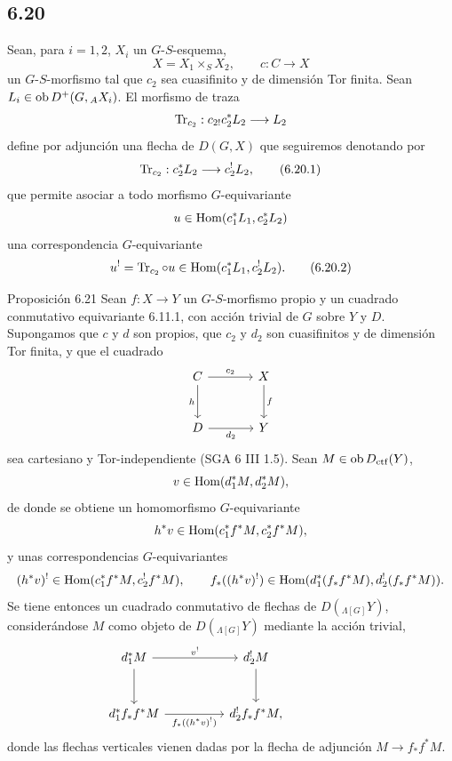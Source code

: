 \subsection*{6.20}
Sean, para $i=1,2$, $X_i$ un $G$-$S$-esquema,
\[
X=X_1\times_SX_2,\qquad c:C\to X
\]
un $G$-$S$-morfismo tal que $c_2$ sea cuasifinito y de dimensión Tor finita. Sean $L_i\in\operatorname{ob} D^+(G,{}_AX_i)$. El morfismo de traza
\[
\operatorname{Tr}_{c_2}:c_{2!}c_2^*L_2\longrightarrow L_2
\]
define por adjunción una flecha de $D(G,X)$ que seguiremos denotando por
\begin{equation}
\operatorname{Tr}_{c_2}:c_2^*L_2\longrightarrow c_2^!L_2,
\tag{6.20.1}
\end{equation}
que permite asociar a todo morfismo $G$-equivariante
\[
u\in\operatorname{Hom}(c_1^*L_1,c_2^*L_2)
\]
una correspondencia $G$-equivariante
\begin{equation}
u^! = \operatorname{Tr}_{c_2}\circ u\in\operatorname{Hom}(c_1^*L_1,c_2^!L_2).
\tag{6.20.2}
\end{equation}

\begin{statement}{Proposición 6.21}
Sean $f:X\to Y$ un $G$-$S$-morfismo propio y un cuadrado conmutativo equivariante 6.11.1, con acción trivial de $G$ sobre $Y$ y $D$. Supongamos que $c$ y $d$ son propios, que $c_2$ y $d_2$ son cuasifinitos y de dimensión Tor finita, y que el cuadrado
\[
\begin{tikzcd}[column sep=large,row sep=large]
C \arrow[r,"c_2"] \arrow[d,"h"'] & X \arrow[d,"f"]\\
D \arrow[r,"d_2"'] & Y
\end{tikzcd}
\]
sea cartesiano y Tor-independiente (SGA 6 III 1.5). Sean $M\in\operatorname{ob} D_{\mathrm{ctf}}(Y)$,
\[
v\in\operatorname{Hom}(d_1^*M,d_2^*M),
\]
de donde se obtiene un homomorfismo $G$-equivariante
\[
h^*v\in\operatorname{Hom}(c_1^*f^*M,c_2^*f^*M),
\]
y unas correspondencias $G$-equivariantes
\[
(h^*v)^!\in\operatorname{Hom}(c_1^*f^*M,c_2^!f^*M),
\qquad
f_*((h^*v)^!)\in\operatorname{Hom}(d_1^*(f_*f^*M),d_2^!(f_*f^*M)).
\]
Se tiene entonces un cuadrado conmutativo de flechas de $D({}_{\Lambda[G]}Y)$, considerándose $M$ como objeto de $D({}_{\Lambda[G]}Y)$ mediante la acción trivial,
\[
\begin{tikzcd}[column sep=huge,row sep=large]
d_1^*M \arrow[r,"v^!"] \arrow[d] & d_2^!M \arrow[d] & {}\\
d_1^*f_*f^*M \arrow[r,"f_*((h^*v)^!)"'] & d_2^!f_*f^*M,
\end{tikzcd}
\]
donde las flechas verticales vienen dadas por la flecha de adjunción $M\to f_*f^*M$.
\end{statement}

